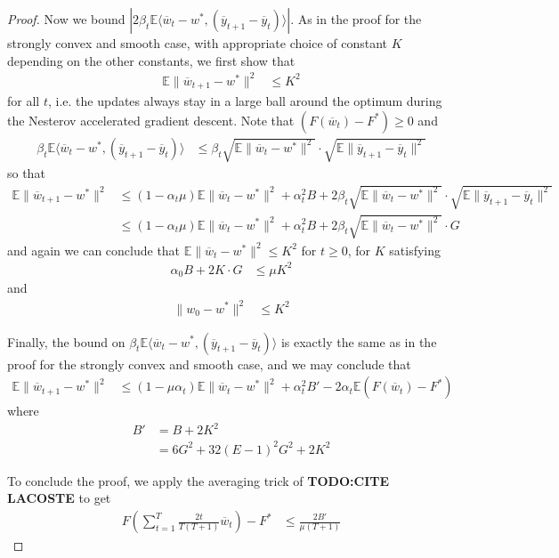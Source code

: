 \begin{proof}
	Now we bound $|2\beta_{t}\mathbb{E}\langle\overline{w}_{t}-w^{\ast},(\overline{y}_{t+1}-\overline{y}_{t})\rangle|$.
	As in the proof for the strongly convex and smooth case, with appropriate
	choice of constant $K$ depending on the other constants, we first
	show that 
	\begin{align*}
	\mathbb{E}\|\overline{w}_{t+1}-w^{\ast}\|^{2} & \leq K^{2}
	\end{align*}
	for all $t$, i.e. the updates always stay in a large ball around
	the optimum during the Nesterov accelerated gradient descent. Note
	that $(F(\overline{w}_{t})-F^{\ast})\geq0$ and 
	\begin{align*}
	\beta_{t}\mathbb{E}\langle\overline{w}_{t}-w^{\ast},(\overline{y}_{t+1}-\overline{y}_{t})\rangle & \leq\beta_{t}\sqrt{\mathbb{E}\|\overline{w}_{t}-w^{\ast}\|^{2}}\cdot\sqrt{\mathbb{E}\|\overline{y}_{t+1}-\overline{y}_{t}\|^{2}}
	\end{align*}
	so that 
	\begin{align*}
	\mathbb{E}\|\overline{w}_{t+1}-w^{\ast}\|^{2} & \leq(1-\alpha_{t}\mu)\mathbb{E}\|\overline{w}_{t}-w^{\ast}\|^{2}+\alpha_{t}^{2}B+2\beta_{t}\sqrt{\mathbb{E}\|\overline{w}_{t}-w^{\ast}\|^{2}}\cdot\sqrt{\mathbb{E}\|\overline{y}_{t+1}-\overline{y}_{t}\|^{2}}\\
	& \leq(1-\alpha_{t}\mu)\mathbb{E}\|\overline{w}_{t}-w^{\ast}\|^{2}+\alpha_{t}^{2}B+2\beta_{t}\sqrt{\mathbb{E}\|\overline{w}_{t}-w^{\ast}\|^{2}}\cdot G
	\end{align*}
	and again we can conclude that $\mathbb{E}\|\overline{w}_{t}-w^{\ast}\|^{2}\leq K^{2}$
	for $t\geq0$, for $K$ satisfying 
	\begin{align*}
	\alpha_{0}B+2K\cdot G & \leq\mu K^{2}
	\end{align*}
	and
	\begin{align*}
	\|w_{0}-w^{\ast}\|^{2} & \leq K^{2}
	\end{align*}
	
	Finally, the bound on $\beta_{t}\mathbb{E}\langle\overline{w}_{t}-w^{\ast},(\overline{y}_{t+1}-\overline{y}_{t})\rangle$
	is exactly the same as in the proof for the strongly convex and smooth
	case, and we may conclude that 
	\begin{align*}
	\mathbb{E}\|\overline{w}_{t+1}-w^{\ast}\|^{2} & \leq(1-\mu\alpha_{t})\mathbb{E}\|\overline{w}_{t}-w^{\ast}\|^{2}+\alpha_{t}^{2}B'-2\alpha_{t}\mathbb{E}(F(\overline{w}_{t})-F^{\ast})
	\end{align*}
	where 
	\begin{align*}
	B' & =B+2K^{2}\\
	& =6G^{2}+32(E-1)^{2}G^{2}+2K^{2}
	\end{align*}
	
	To conclude the proof, we apply the averaging trick of \textbf{TODO:CITE
		LACOSTE }to get \textbf{
		\begin{align*}
		F(\sum_{t=1}^{T}\frac{2t}{T(T+1)}\overline{w}_{t})-F^{\ast} & \leq\frac{2B'}{\mu(T+1)}
		\end{align*}
	}
\end{proof}
